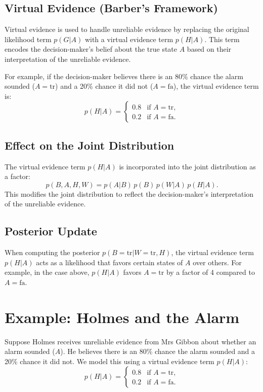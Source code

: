 \begin{notechapter}
\subsection{Virtual Evidence (Barber's Framework)}
Virtual evidence is used to handle unreliable evidence by replacing
the original likelihood term \( p(G | A) \) with a virtual evidence
term \( p(H | A) \). This term encodes the decision-maker's belief
about the true state \( A \) based on their interpretation of the
unreliable evidence.

For example, if the decision-maker believes there is an 80\% chance
the alarm sounded (\( A = \text{tr} \)) and a 20\% chance it did not
(\( A = \text{fa} \)), the virtual evidence term is:
\[
p(H | A) = 
\begin{cases}
0.8 & \text{if } A = \text{tr}, \\
0.2 & \text{if } A = \text{fa}.
\end{cases}
\]

\subsection{Effect on the Joint Distribution}
The virtual evidence term \( p(H | A) \) is incorporated into the
joint distribution as a factor:
\[
p(B, A, H, W) = p(A | B) \, p(B) \, p(W | A) \, p(H | A).
\]
This modifies the joint distribution to reflect the decision-maker's
interpretation of the unreliable evidence.

\subsection{Posterior Update}
When computing the posterior \( p(B = \text{tr} | W = \text{tr}, H) \),
the virtual evidence term \( p(H | A) \) acts as a likelihood that
favors certain states of \( A \) over others. For example, in the
case above, \( p(H | A) \) favors \( A = \text{tr} \) by a factor
of 4 compared to \( A = \text{fa} \).

\section{Example: Holmes and the Alarm}
Suppose Holmes receives unreliable evidence from Mrs Gibbon about
whether an alarm sounded (\( A \)). He believes there is an 80\%
chance the alarm sounded and a 20\% chance it did not. We model
this using a virtual evidence term \( p(H | A) \):
\[
p(H | A) = 
\begin{cases}
0.8 & \text{if } A = \text{tr}, \\
0.2 & \text{if } A = \text{fa}.
\end{cases}
\]


\end{notechapter}
